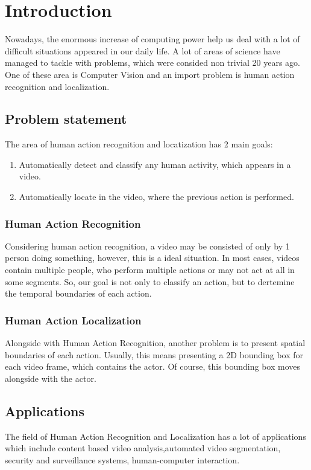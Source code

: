 \documentclass{report}
\begin{document}
\chapter{Introduction}
Nowadays, the enormous increase of computing power help us deal with a lot of difficult situations appeared in our daily life.
A lot of areas of science have managed to tackle with problems, which were consided non trivial 20 years ago. One of
these area is Computer Vision and an import problem is human action recognition and localization.
\section{Problem statement}
The area of human action recognition and locatization has 2 main goals:
\begin{enumerate}
\item Automatically detect and classify any human activity, which appears in a video.
\item Automatically locate in the video, where the previous action is performed.
\end{enumerate}

\subsection{Human Action Recognition}
Considering human action recognition, a video may be consisted of only by 1 person doing something, however, this is a ideal
situation. In most cases, videos contain multiple people, who perform multiple actions or may not act at all in some segments.
So, our goal is not only to classify an action, but to dertemine the temporal boundaries of each action.
\subsection{Human Action Localization}
Alongside with Human Action Recognition, another problem is to present spatial boundaries of each action. Usually, this means
presenting a 2D bounding box for each video frame, which contains the actor. Of course, this bounding box moves alongside with
the actor.

\section{Applications}
The field of Human Action Recognition and Localization has a lot of applications which include 
 content based video analysis,automated video segmentation, security and surveillance systems,
human-computer interaction.
\end{document}
